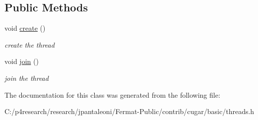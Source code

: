 \subsection*{Public Methods}
\begin{DoxyCompactItemize}
\item 
\mbox{\label{classcugar_1_1_thread_adada4b3267ea9be60732969db83b402e}} 
void \hyperlink{classcugar_1_1_thread_adada4b3267ea9be60732969db83b402e}{create} ()
\begin{DoxyCompactList}\small\item\em create the thread \end{DoxyCompactList}\item 
\mbox{\label{classcugar_1_1_thread_a77376c060659561647e8adc49bdb1a1d}} 
void \hyperlink{classcugar_1_1_thread_a77376c060659561647e8adc49bdb1a1d}{join} ()
\begin{DoxyCompactList}\small\item\em join the thread \end{DoxyCompactList}\end{DoxyCompactItemize}


The documentation for this class was generated from the following file\+:\begin{DoxyCompactItemize}
\item 
C\+:/p4research/research/jpantaleoni/\+Fermat-\/\+Public/contrib/cugar/basic/threads.\+h\end{DoxyCompactItemize}
